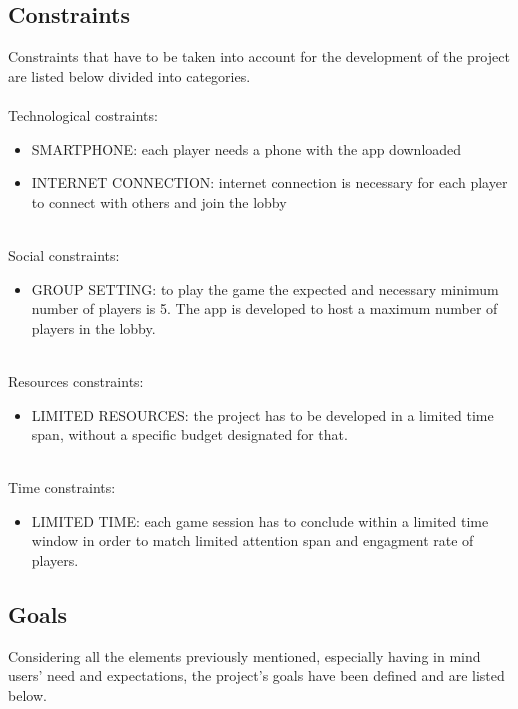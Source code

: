 \documentclass[12pt]{article}
\begin{document}
\subsection{Constraints}
Constraints that have to be taken into account for the development of the project are listed below divided into categories.
\\
\\Technological costraints:
\begin{itemize}
    \item SMARTPHONE: each player needs a phone with the app downloaded
    \item INTERNET CONNECTION: internet connection is necessary for each player to connect with others and join the lobby
\end{itemize}
\\
Social constraints:
\begin{itemize}
    \item GROUP SETTING: to play the game the expected and necessary minimum number of players is 5. The app is developed to host a maximum number of players in the lobby. 
\end{itemize}
\\
Resources constraints:
\begin{itemize}
    \item LIMITED RESOURCES: the project has to be developed in a limited time span, without a specific budget designated for that.
\end{itemize}
\\
Time constraints:
\begin{itemize}
    \item LIMITED TIME: each game session has to conclude within a limited time window in order to match limited attention span and engagment rate of players.
\end{itemize}

\subsection{Goals}
Considering all the elements previously mentioned, especially having in mind users' need and expectations, the project's goals have been defined and are listed below.
\end{document}
